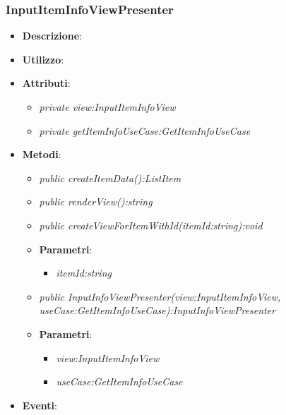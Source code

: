 \subsubsection{InputItemInfoViewPresenter}
\begin{itemize}
\item \textbf{Descrizione}: 
\item \textbf{Utilizzo}:
\item \textbf{Attributi}: 
	\begin{itemize}
	\item \textit{private view:InputItemInfoView}\\
	
	\item \textit{private getItemInfoUseCase:GetItemInfoUseCase}\\

	\end{itemize}
\item \textbf{Metodi}:
	\begin{itemize}
	\item \textit{public createItemData():ListItem}\\

	\item \textit{public renderView():string}\\

	\item \textit{public createViewForItemWithId(itemId:string):void}\\

			\item{\textbf{Parametri}: \begin{itemize}
			\item \textit{itemId:string}\\

			\end{itemize}}
			\item \textit{public InputInfoViewPresenter(view:InputItemInfoView, useCase:GetItemInfoUseCase):InputInfoViewPresenter}\\
			
				\item{\textbf{Parametri}: \begin{itemize}
				\item \textit{view:InputItemInfoView}\\
				
				\item \textit{useCase:GetItemInfoUseCase}\\
				
			\end{itemize}}
	\end{itemize}
\item \textbf{Eventi}:
\end{itemize}

